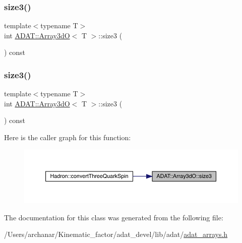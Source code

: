 \subsubsection{\texorpdfstring{size3()}{size3()}\hspace{0.1cm}{\footnotesize\ttfamily [1/2]}}
{\footnotesize\ttfamily template$<$typename T$>$ \\
int \mbox{\hyperlink{classADAT_1_1Array3dO}{A\+D\+A\+T\+::\+Array3dO}}$<$ T $>$\+::size3 (\begin{DoxyParamCaption}{ }\end{DoxyParamCaption}) const\hspace{0.3cm}{\ttfamily [inline]}}

\mbox{\label{classADAT_1_1Array3dO_acd5ccea08cb9cde541a396823af21161}} 
\subsubsection{\texorpdfstring{size3()}{size3()}\hspace{0.1cm}{\footnotesize\ttfamily [2/2]}}
{\footnotesize\ttfamily template$<$typename T$>$ \\
int \mbox{\hyperlink{classADAT_1_1Array3dO}{A\+D\+A\+T\+::\+Array3dO}}$<$ T $>$\+::size3 (\begin{DoxyParamCaption}{ }\end{DoxyParamCaption}) const\hspace{0.3cm}{\ttfamily [inline]}}

Here is the caller graph for this function\+:\nopagebreak
\begin{figure}[H]
\begin{center}
\leavevmode
\includegraphics[width=350pt]{dd/da8/classADAT_1_1Array3dO_acd5ccea08cb9cde541a396823af21161_icgraph}
\end{center}
\end{figure}


The documentation for this class was generated from the following file\+:\begin{DoxyCompactItemize}
\item 
/\+Users/archanar/\+Kinematic\+\_\+factor/adat\+\_\+devel/lib/adat/\mbox{\hyperlink{lib_2adat_2adat__arrays_8h}{adat\+\_\+arrays.\+h}}\end{DoxyCompactItemize}
